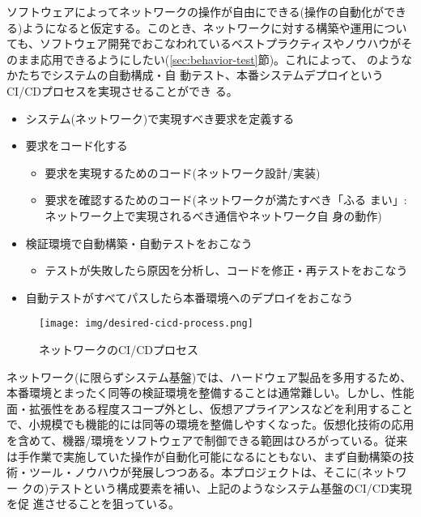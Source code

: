 ソフトウェアによってネットワークの操作が自由にできる(操作の自動化ができ
る)ようになると仮定する。このとき、ネットワークに対する構築や運用につい
ても、ソフトウェア開発でおこなわれているベストプラクティスやノウハウがそ
のまま応用できるようにしたい(\ref{sec:behavior-test}節)。これによって、
のようなかたちでシステムの自動構成・自
動テスト、本番システムデプロイというCI/CDプロセスを実現させることができ
る。
\begin{itemize}
 \item システム(ネットワーク)で実現すべき要求を定義する
 \item 要求をコード化する
       \begin{itemize}
        \item 要求を実現するためのコード(ネットワーク設計/実装)
        \item 要求を確認するためのコード(ネットワークが満たすべき「ふる
              まい」: ネットワーク上で実現されるべき通信やネットワーク自
              身の動作)
       \end{itemize}
 \item 検証環境で自動構築・自動テストをおこなう
       \begin{itemize}
        \item テストが失敗したら原因を分析し、コードを修正・再テストをおこなう
       \end{itemize}
 \item 自動テストがすべてパスしたら本番環境へのデプロイをおこなう
\end{itemize}

\begin{figure}[h]
 \centering
 \texttt{[image: img/desired-cicd-process.png]}
 \caption{ネットワークのCI/CDプロセス}
 \label{fig:desired-cicd-process}
\end{figure}

ネットワーク(に限らずシステム基盤)では、ハードウェア製品を多用するため、
本番環境とまったく同等の検証環境を整備することは通常難しい。しかし、性能
面・拡張性をある程度スコープ外とし、仮想アプライアンスなどを利用すること
で、小規模でも機能的には同等の環境を整備しやすくなった。仮想化技術の応用
を含めて、機器/環境をソフトウェアで制御できる範囲はひろがっている。従来
は手作業で実施していた操作が自動化可能になるにともない、まず自動構築の技
術・ツール・ノウハウが発展しつつある。本プロジェクトは、そこに(ネットワー
クの)テストという構成要素を補い、上記のようなシステム基盤のCI/CD実現を促
進させることを狙っている。


